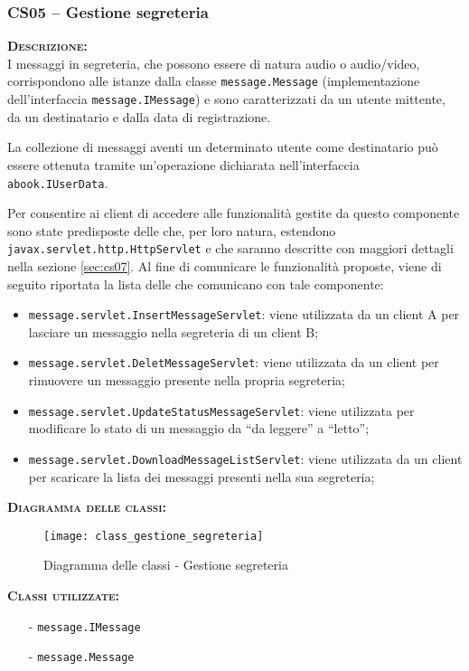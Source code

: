 \subsubsection{CS05 -- Gestione segreteria}\label{sec:cs05}
\begin{description}
	\item{\scshape\bfseries Descrizione:}\\
I messaggi in segreteria, che possono essere di natura audio o audio/video, corrispondono alle istanze dalla classe \texttt{message.Message} (implementazione dell'interfaccia \texttt{message.IMessage}) e sono caratterizzati da un utente mittente, da un destinatario e dalla data di registrazione.

La collezione di messaggi aventi un determinato utente come destinatario può essere ottenuta tramite un'operazione dichiarata nell'interfaccia \texttt{abook.IUserData}.

Per consentire ai client di accedere alle funzionalità gestite da questo componente sono state predisposte delle  che, per loro natura, estendono \texttt{javax.servlet.http.HttpServlet} e che saranno descritte con maggiori dettagli nella sezione \vref{sec:cs07}. Al fine di comunicare le funzionalità proposte, viene di seguito riportata la lista delle  che comunicano con tale componente:

\begin{itemize}
	\item \texttt{message.servlet.InsertMessageServlet}: viene utilizzata da un client A per lasciare un messaggio nella segreteria di un client B;
	\item \texttt{message.servlet.DeletMessageServlet}: viene utilizzata da un client per rimuovere un messaggio presente nella propria segreteria;
	\item \texttt{message.servlet.UpdateStatusMessageServlet}: viene utilizzata per modificare lo stato di un messaggio da ``da leggere'' a ``letto'';
	\item \texttt{message.servlet.DownloadMessageListServlet}: viene utilizzata da un client per scaricare la lista dei messaggi presenti nella sua segreteria;
\end{itemize}

	\item{\scshape\bfseries Diagramma delle classi:}
\begin{figure}[H]
  \centering
  \texttt{[image: class\_gestione\_segreteria]}
  \caption{Diagramma delle classi - Gestione segreteria}\label{fig:gestionesegreteria}
\end{figure}	
	
	\item{\scshape\bfseries Classi utilizzate:}
	\begin{itemize}[noitemsep,nolistsep]
		\item[-] \texttt{message.IMessage}
	  	\item[-] \texttt{message.Message}
	\end{itemize}
\end{description}


